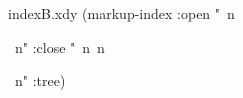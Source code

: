  
 
 
\begin{filecontents*}{indexB.xdy}
(markup-index :open  "~n
\begin{theindex}
  \providecommand*\lettergroupDefault[1]{}
  \providecommand*\lettergroup[1]{%
    \textit{#1}
    \nopagebreak
  }
  ~n"
  :close "~n~n\end{theindex}~n"
:tree)
\end{filecontents*}

